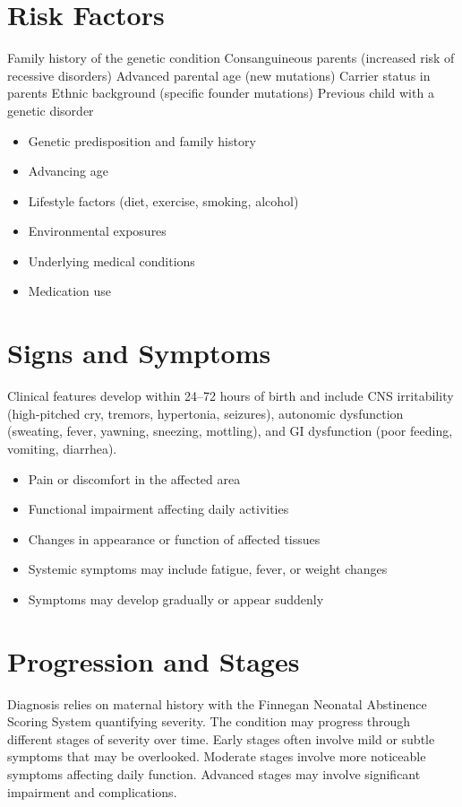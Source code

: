 \section{Risk Factors}
Family history of the genetic condition Consanguineous parents (increased risk of recessive disorders) Advanced parental age (new mutations) Carrier status in parents Ethnic background (specific founder mutations) Previous child with a genetic disorder

\begin{itemize}[noitemsep]
  \item Genetic predisposition and family history
  \item Advancing age
  \item Lifestyle factors (diet, exercise, smoking, alcohol)
  \item Environmental exposures
  \item Underlying medical conditions
  \item Medication use
\end{itemize}
\section{Signs and Symptoms}
Clinical features develop within 24--72 hours of birth and include CNS irritability (high-pitched cry, tremors, hypertonia, seizures), autonomic dysfunction (sweating, fever, yawning, sneezing, mottling), and GI dysfunction (poor feeding, vomiting, diarrhea).

\begin{itemize}[noitemsep]
  \item Pain or discomfort in the affected area
  \item Functional impairment affecting daily activities
  \item Changes in appearance or function of affected tissues
  \item Systemic symptoms may include fatigue, fever, or weight changes
  \item Symptoms may develop gradually or appear suddenly
\end{itemize}
\section{Progression and Stages}
Diagnosis relies on maternal history with the Finnegan Neonatal Abstinence Scoring System quantifying severity. The condition may progress through different stages of severity over time. Early stages often involve mild or subtle symptoms that may be overlooked. Moderate stages involve more noticeable symptoms affecting daily function. Advanced stages may involve significant impairment and complications.
